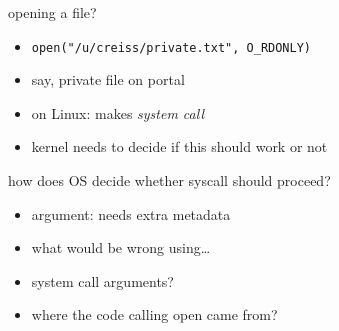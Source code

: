 \begin{frame}{opening a file?}
\begin{itemize}
\item \texttt{open("/u/creiss/private.txt", O\_RDONLY)}
\item say, private file on portal
\vspace{.5cm}
\item on Linux: makes \textit{system call}
\item kernel needs to decide if this should work or not
\end{itemize}
\end{frame}



\begin{frame}{how does OS decide whether syscall should proceed?}
\begin{itemize}
\item argument: needs extra metadata
\vspace{.5cm}
\item what would be wrong using\ldots
\item system call arguments?
\item where the code calling open came from?
\end{itemize}
\end{frame}

